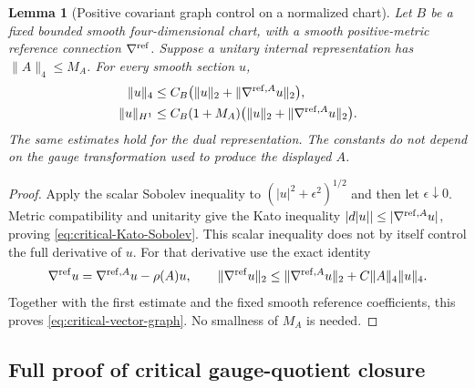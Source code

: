 \documentclass[11pt]{article}
\numberwithin{equation}{section}
\newtheorem{lemma}[lemma]{Lemma}
\theoremstyle{definition}
\theoremstyle{remark}
\newcommand{\norm}[1]{\lVert#1\rVert}
\begin{document}
\begin{lemma}[Positive covariant graph control on a normalized chart]
\label{lem:critical-positive-graph}
Let $B$ be a fixed bounded smooth four-dimensional chart, with a smooth
positive-metric reference connection $\nabla^{\rm ref}$. Suppose a unitary
internal representation has $\norm{A}_4\le M_A$. For every smooth section $u$,
\begin{align}
 \norm u_4
 &\le C_B\bigl(\norm u_2+
                  \norm{\nabla^{{\rm ref},A}u}_2\bigr),
       \label{eq:critical-Kato-Sobolev}\\
 \norm u_{H^1}
 &\le C_B(1+M_A)\bigl(\norm u_2+
                  \norm{\nabla^{{\rm ref},A}u}_2\bigr).
       \label{eq:critical-vector-graph}
\end{align}
The same estimates hold for the dual representation. The constants do not
depend on the gauge transformation used to produce the displayed $A$.
\end{lemma}
\begin{proof}
Apply the scalar Sobolev inequality to
$(|u|^2+\epsilon^2)^{1/2}$ and then let $\epsilon\downarrow0$.
Metric compatibility and unitarity give the Kato inequality
$|d|u||\le|\nabla^{{\rm ref},A}u|$, proving
\eqref{eq:critical-Kato-Sobolev}. This scalar inequality does not by itself
control the full derivative of $u$. For that derivative use the exact identity
\[
 \nabla^{\rm ref}u=\nabla^{{\rm ref},A}u-\rho(A)u,
 \qquad
 \norm{\nabla^{\rm ref}u}_2
 \le\norm{\nabla^{{\rm ref},A}u}_2+C\norm A_4\norm u_4.
\]
Together with the first estimate and the fixed smooth reference coefficients,
this proves \eqref{eq:critical-vector-graph}. No smallness of $M_A$ is needed.
\end{proof}

\subsection{Full proof of critical gauge-quotient closure}
\label{app:critical-quotient-proof}
\end{document}
